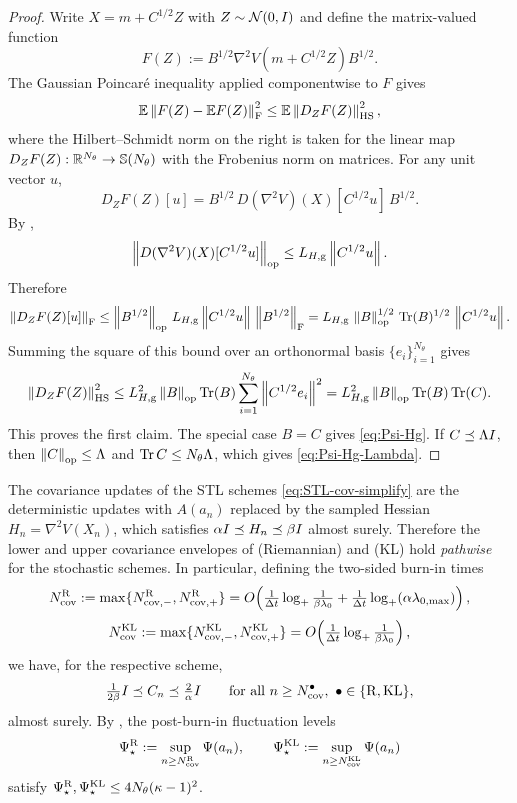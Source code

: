 \begin{proof}
Write $X=m+C^{1/2}Z$ with $Z\sim\mathcal{N}(0,I)$ and define the matrix-valued function
\[
    F(Z):=B^{1/2}\nabla^2V(m+C^{1/2}Z)B^{1/2}.
\]
The Gaussian Poincar\'e inequality applied componentwise to $F$ gives
\[
    \mathbb{E}\left\lVert F(Z)-\mathbb{E} F(Z)\right\rVert_{\mathrm{F}}^2
    \leq
    \mathbb{E}\left\lVert D_ZF(Z)\right\rVert_{\mathrm{HS}}^2,
\]
where the Hilbert--Schmidt norm on the right is taken for the linear map
$D_ZF(Z):\mathbb{R}^{N_\theta}\to\mathbb{S}(N_\theta)$ with the Frobenius norm on matrices.
For any unit vector $u$,
\[
    D_ZF(Z)[u]
    =
    B^{1/2}\,D(\nabla^2V)(X)[C^{1/2}u]\,B^{1/2}.
\]
By ,
\[
    \left\lVert D(\nabla^2V)(X)[C^{1/2}u]\right\rVert_{\mathrm{op}}
    \leq
    L_{H,\mathrm g}\left\lVert C^{1/2}u\right\rVert.
\]
Therefore
\[
    \left\lVert D_ZF(Z)[u]\right\rVert_{\mathrm{F}}
    \leq
    \left\lVert B^{1/2}\right\rVert_{\mathrm{op}}\,
    L_{H,\mathrm g}\left\lVert C^{1/2}u\right\rVert\,
    \left\lVert B^{1/2}\right\rVert_{\mathrm{F}}
    =
    L_{H,\mathrm g}\,\left\lVert B\right\rVert_{\mathrm{op}}^{1/2}\,\operatorname{Tr}(B)^{1/2}\,\left\lVert C^{1/2}u\right\rVert.
\]
Summing the square of this bound over an orthonormal basis $\{e_i\}_{i=1}^{N_\theta}$ gives
\[
    \left\lVert D_ZF(Z)\right\rVert_{\mathrm{HS}}^2
    \leq
    L_{H,\mathrm g}^2\left\lVert B\right\rVert_{\mathrm{op}}\operatorname{Tr}(B)\sum_{i=1}^{N_\theta}\left\lVert C^{1/2}e_i\right\rVert^2
    =
    L_{H,\mathrm g}^2\left\lVert B\right\rVert_{\mathrm{op}}\operatorname{Tr}(B)\operatorname{Tr}(C).
\]
This proves the first claim. The special case $B=C$ gives \eqref{eq:Psi-Hg}. If
$C\preceq\Lambda I$, then $\left\lVert C\right\rVert_{\mathrm{op}}\leq\Lambda$ and $\operatorname{Tr} C\leq N_\theta\Lambda$,
which gives \eqref{eq:Psi-Hg-Lambda}.
\end{proof}

\begin{remark}
\label{rem:pathwise-bootstrap}
The covariance updates of the STL schemes \eqref{eq:STL-cov-simplify} are the
deterministic updates with $A(a_n)$ replaced by the sampled Hessian $H_n=\nabla^2V(X_n)$,
which satisfies $\alpha I\preceq H_n\preceq\beta I$ almost surely. Therefore the lower
and upper covariance envelopes of  (Riemannian) and 
(KL) hold \emph{pathwise} for the stochastic schemes. In particular, defining the
two-sided burn-in times
\[
    N_{\mathrm{cov}}^{\mathrm{R}}:=\max\{N_{\mathrm{cov},-}^{\mathrm{R}},N_{\mathrm{cov},+}^{\mathrm{R}}\}
    =O\!\left(\tfrac1{\Delta t}\log_+\tfrac1{\beta\lambda_0}+\tfrac1{\Delta t}\log_+(\alpha\lambda_{0,\max})\right),
\]
\[
    N_{\mathrm{cov}}^{\mathrm{KL}}:=\max\{N_{\mathrm{cov},-}^{\mathrm{KL}},N_{\mathrm{cov},+}^{\mathrm{KL}}\}
    =O\!\left(\tfrac1{\Delta t}\log_+\tfrac1{\beta\lambda_0}\right),
\]
we have, for the respective scheme,
\[
    \tfrac1{2\beta}\Id\preceq C_n\preceq\tfrac2\alpha\Id
    \qquad\text{for all }n\geq N_{\cov}^{\bullet},\ \bullet\in\{\Riem,\KL\},
\]
almost surely. By , the post-burn-in fluctuation levels
\[
    \Psi_\star^{\mathrm{R}}:=\sup_{n\geq N_{\mathrm{cov}}^{\mathrm{R}}}\Psi(a_n),
    \qquad
    \Psi_\star^{\mathrm{KL}}:=\sup_{n\geq N_{\mathrm{cov}}^{\mathrm{KL}}}\Psi(a_n)
\]
satisfy $\Psi_\star^{\mathrm{R}},\Psi_\star^{\mathrm{KL}}\leq4N_\theta(\kappa-1)^2$.
\end{remark}

